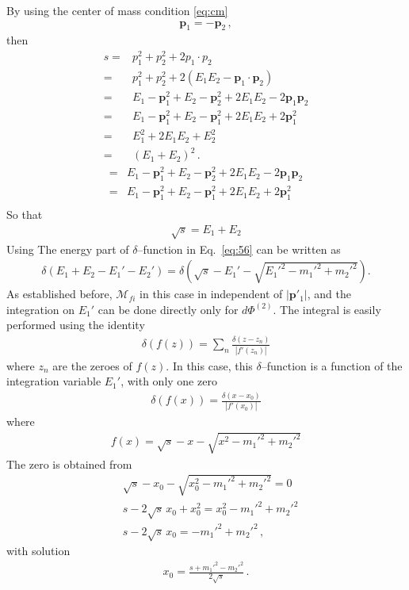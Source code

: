 By using the center of mass condition \eqref{eq:cm}
\begin{align}
  \mathbf{p}_1=-\mathbf{p}_2\,,
\end{align}
then
\begin{align}
   s=& p_1^2+p_2^2+2 p_1\cdot p_2 \nonumber\\
=&  p_1^2+p_2^2+2  \left( E_1 E_2-\mathbf{p}_1\cdot\mathbf{p}_2 \right)\nonumber\\
=&E_1-\mathbf{p}_1^2+E_2-\mathbf{p}_2^2+2 E_1 E_2-2 \mathbf{p}_1\mathbf{p}_2\nonumber\\
=&E_1-\mathbf{p}_1^2+E_2-\mathbf{p}_1^2+2 E_1 E_2+2 \mathbf{p}_1^2\nonumber\\
=& E_1^2 +2E_1 E_2+ E_2^2 \nonumber\\
=& \left( E_1+E_2 \right)^2\,.
\end{align}
\begin{align}
  =&E_1-\mathbf{p}_1^2+E_2-\mathbf{p}_2^2+2 E_1 E_2-2 \mathbf{p}_1\mathbf{p}_2\nonumber\\
  =&E_1-\mathbf{p}_1^2+E_2-\mathbf{p}_1^2+2 E_1 E_2+2 \mathbf{p}_1^2\nonumber\\
  
\end{align}
So that
\begin{align}
  \label{eq:60}
  \sqrt{s}=E_1+E_2
\end{align}
Using The energy part of $\delta$--function in Eq.~\eqref{eq:56} can be written as
\begin{align}
  \delta \left( E_1+E_2-E_1'-E_2' \right)=\delta\left(\sqrt{s}-E_1'-\sqrt{{E_1'}^2-{m_1'}^2+{m_2'}^2}\right).
\end{align}
As established before,  $\mathcal{M}_{fi}$ in this case in independent of $|\mathbf{p}'_1|$, and the integration on $E_1'$ can be done directly only for $d\Phi^{(2)}$.
The integral is easily performed using the identity
\begin{align}
  \delta\left(f(z)\right)=\sum_n\frac{\delta(z-z_n)}{|f'(z_n)|}
\end{align}
where $z_n$ are the zeroes of $f(z)$. In this case, this $\delta$--function is a function of the integration variable $E_1'$, with only one zero
\begin{align}
   \delta\left(f(x)\right)=\frac{\delta(x-x_0)}{|f'(x_0)|}
\end{align}
where
\begin{align}
  f(x)=\sqrt{s}-x-\sqrt{x^2-{m_1'}^2+{m_2'}^2}
\end{align}
The zero is obtained from
\begin{align}
  &\sqrt{s}-x_0-\sqrt{x_0^2-{m_1'}^2+{m_2'}^2}=0\nonumber\\
  &s-2\sqrt{s}\,x_0+x_0^2=x_0^2-{m_1'}^2+{m_2'}^2\nonumber\\
  &s-2\sqrt{s}\,x_0=-{m_1'}^2+{m_2'}^2\,,
\end{align}
with solution
\begin{align}
  \label{eq:63}
  x_0=\frac{s+{m_1'}^2-{m_2'}^2}{2\sqrt{s}}\,.
\end{align}


